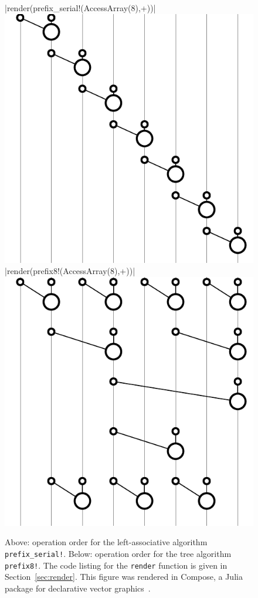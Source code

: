 \documentclass{sig-alternate}
\newcommand{\code}[1]{\texttt{#1}}
\begin{document}
\begin{figure}
  \centering

  |render(prefix_serial!(AccessArray(8),+))|
  \includegraphics{serial}
  \vspace{12 pt}
  |render(prefix8!(AccessArray(8),+))|
  \includegraphics{tree}
  \caption{Above: operation order for the left-associative algorithm
	  \code{prefix\allowbreak\_serial!}.
	  Below: operation order for the tree algorithm \code{prefix8!}.
	  The code listing for the \code{render} function is given in
	  Section~\ref{sec:render}. This figure was rendered in Compose, a
	  Julia package for declarative vector graphics~\cite{Compose.jl}.}
   \label{fig:gates}
\end{figure}
\end{document}
